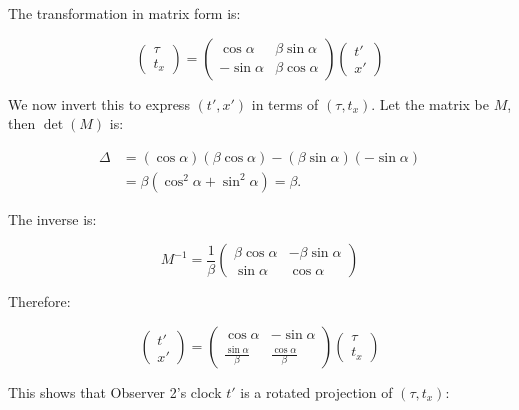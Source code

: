 \documentclass{article}
\begin{document}
The transformation in matrix form is:

\begin{equation}
\begin{pmatrix} \tau \\ t_x \end{pmatrix} = 
\begin{pmatrix} \cos\alpha & \beta\sin\alpha \\
               -\sin\alpha & \beta\cos\alpha \end{pmatrix}
\begin{pmatrix} t' \\ x' \end{pmatrix}
\end{equation}

We now invert this to express $(t', x')$ in terms of $(\tau, t_x)$.
Let the matrix be $M$, then $\det(M)$ is:

\begin{align}
\Delta &= (\cos\alpha)(\beta\cos\alpha) - (\beta\sin\alpha)(-\sin\alpha) \\
       &= \beta(\cos^2\alpha + \sin^2\alpha) = \beta.
\end{align}

The inverse is:

\begin{equation}
M^{-1} = \frac{1}{\beta}
\begin{pmatrix} \beta\cos\alpha & -\beta\sin\alpha \\
                \sin\alpha & \cos\alpha \end{pmatrix}
\end{equation}

Therefore:

\begin{equation}
\begin{pmatrix} t' \\ x' \end{pmatrix} = 
\begin{pmatrix} \cos\alpha & -\sin\alpha \\
                \frac{\sin\alpha}{\beta} & \frac{\cos\alpha}{\beta} \end{pmatrix}
\begin{pmatrix} \tau \\ t_x \end{pmatrix}
\end{equation}

This shows that Observer 2's clock $t'$ is a rotated projection of $(\tau, t_x)$:
\end{document}
